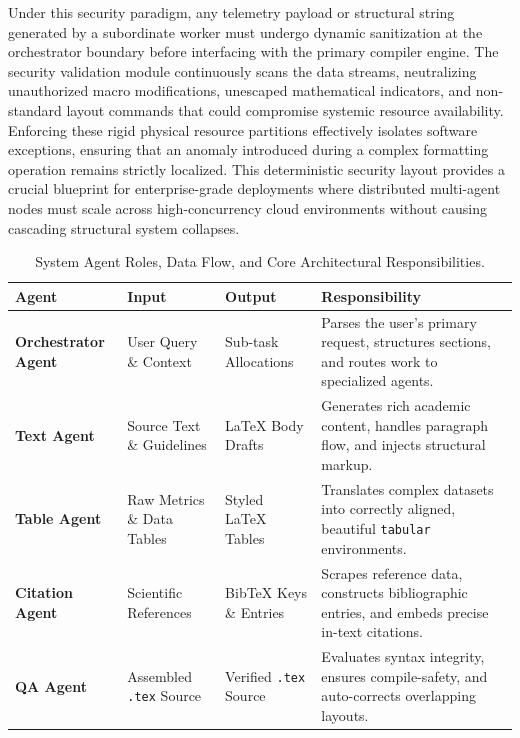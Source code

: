 Under this security paradigm, any telemetry payload or structural string generated by a subordinate worker must undergo dynamic sanitization at the orchestrator boundary before interfacing with the primary compiler engine. The security validation module continuously scans the data streams, neutralizing unauthorized macro modifications, unescaped mathematical indicators, and non-standard layout commands that could compromise systemic resource availability. Enforcing these rigid physical resource partitions effectively isolates software exceptions, ensuring that an anomaly introduced during a complex formatting operation remains strictly localized. This deterministic security layout provides a crucial blueprint for enterprise-grade deployments where distributed multi-agent nodes must scale across high-concurrency cloud environments without causing cascading structural system collapses.

\begin{table}[htbp]
\centering
\small
\caption{System Agent Roles, Data Flow, and Core Architectural Responsibilities.}
\label{tab:agent_roles}
\begin{tabular}{lp{3.0cm}p{3.0cm}p{5.5cm}}
\toprule
\textbf{Agent} & \textbf{Input} & \textbf{Output} & \textbf{Responsibility} \\
\midrule
\textbf{Orchestrator Agent} & User Query \& Context & Sub-task Allocations & Parses the user's primary request, structures sections, and routes work to specialized agents. \\
\textbf{Text Agent} & Source Text \& Guidelines & LaTeX Body Drafts & Generates rich academic content, handles paragraph flow, and injects structural markup. \\
\textbf{Table Agent} & Raw Metrics \& Data Tables & Styled LaTeX Tables & Translates complex datasets into correctly aligned, beautiful \texttt{tabular} environments. \\
\textbf{Citation Agent} & Scientific References & BibTeX Keys \& Entries & Scrapes reference data, constructs bibliographic entries, and embeds precise in-text citations. \\
\textbf{QA Agent} & Assembled \texttt{.tex} Source & Verified \texttt{.tex} Source & Evaluates syntax integrity, ensures compile-safety, and auto-corrects overlapping layouts. \\
\bottomrule
\end{tabular}
\end{table}

